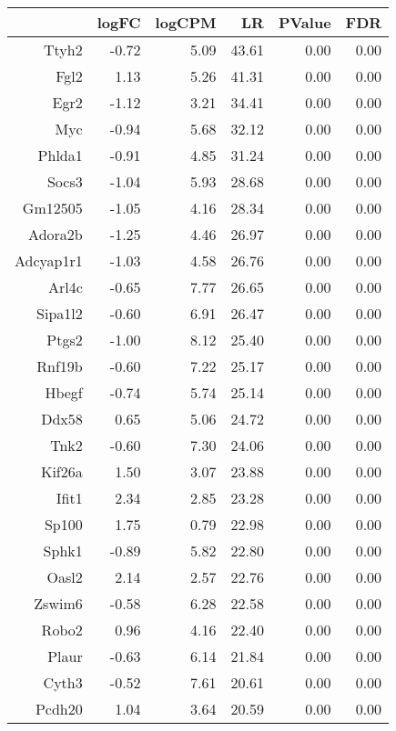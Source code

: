 \begin{table}[ht]
\centering
\begin{tabular}{rrrrrr}
  \hline
 & logFC & logCPM & LR & PValue & FDR \\ 
  \hline
Ttyh2 & -0.72 & 5.09 & 43.61 & 0.00 & 0.00 \\ 
  Fgl2 & 1.13 & 5.26 & 41.31 & 0.00 & 0.00 \\ 
  Egr2 & -1.12 & 3.21 & 34.41 & 0.00 & 0.00 \\ 
  Myc & -0.94 & 5.68 & 32.12 & 0.00 & 0.00 \\ 
  Phlda1 & -0.91 & 4.85 & 31.24 & 0.00 & 0.00 \\ 
  Socs3 & -1.04 & 5.93 & 28.68 & 0.00 & 0.00 \\ 
  Gm12505 & -1.05 & 4.16 & 28.34 & 0.00 & 0.00 \\ 
  Adora2b & -1.25 & 4.46 & 26.97 & 0.00 & 0.00 \\ 
  Adcyap1r1 & -1.03 & 4.58 & 26.76 & 0.00 & 0.00 \\ 
  Arl4c & -0.65 & 7.77 & 26.65 & 0.00 & 0.00 \\ 
  Sipa1l2 & -0.60 & 6.91 & 26.47 & 0.00 & 0.00 \\ 
  Ptgs2 & -1.00 & 8.12 & 25.40 & 0.00 & 0.00 \\ 
  Rnf19b & -0.60 & 7.22 & 25.17 & 0.00 & 0.00 \\ 
  Hbegf & -0.74 & 5.74 & 25.14 & 0.00 & 0.00 \\ 
  Ddx58 & 0.65 & 5.06 & 24.72 & 0.00 & 0.00 \\ 
  Tnk2 & -0.60 & 7.30 & 24.06 & 0.00 & 0.00 \\ 
  Kif26a & 1.50 & 3.07 & 23.88 & 0.00 & 0.00 \\ 
  Ifit1 & 2.34 & 2.85 & 23.28 & 0.00 & 0.00 \\ 
  Sp100 & 1.75 & 0.79 & 22.98 & 0.00 & 0.00 \\ 
  Sphk1 & -0.89 & 5.82 & 22.80 & 0.00 & 0.00 \\ 
  Oasl2 & 2.14 & 2.57 & 22.76 & 0.00 & 0.00 \\ 
  Zswim6 & -0.58 & 6.28 & 22.58 & 0.00 & 0.00 \\ 
  Robo2 & 0.96 & 4.16 & 22.40 & 0.00 & 0.00 \\ 
  Plaur & -0.63 & 6.14 & 21.84 & 0.00 & 0.00 \\ 
  Cyth3 & -0.52 & 7.61 & 20.61 & 0.00 & 0.00 \\ 
  Pcdh20 & 1.04 & 3.64 & 20.59 & 0.00 & 0.00 \\ 

\end{tabular}
\end{table}

